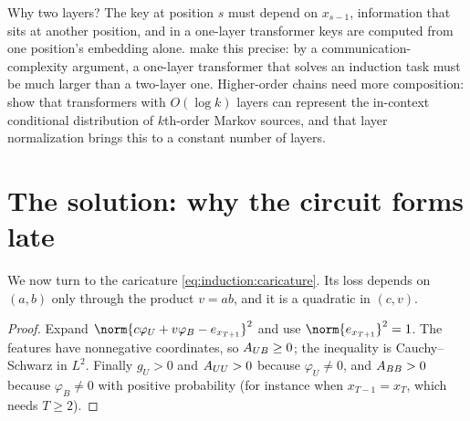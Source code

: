\begin{refsection}
Why two layers? The key at position $s$ must depend on $x_{s-1}$, information that sits at another position, and in a one-layer transformer keys are computed from one position's embedding alone. \Textcite{SanfordEtAl2024} make this precise: by a communication-complexity argument, a one-layer transformer that solves an induction task must be much larger than a two-layer one. Higher-order chains need more composition: \textcite{RajaramanEtAl2024} show that transformers with $O(\log k)$ layers can represent the in-context conditional distribution of $k$th-order Markov sources, and that layer normalization brings this to a constant number of layers.

\section{The solution: why the circuit forms late}\label{sec:induction:dynamics}

We now turn to the caricature \eqref{eq:induction:caricature}. Its loss depends on $(a,b)$ only through the product $v=ab$, and it is a quadratic in $(c,v)$.


\begin{proof}
Expand $\norm{c\varphi_U+v\varphi_B-e_{x_{T+1}}}^2$ and use $\norm{e_{x_{T+1}}}^2=1$. The features have nonnegative coordinates, so $A_{UB}\ge0$; the inequality is Cauchy--Schwarz in $L^2$. Finally $g_U>0$ and $A_{UU}>0$ because $\varphi_U\ne0$, and $A_{BB}>0$ because $\varphi_B\ne0$ with positive probability (for instance when $x_{T-1}=x_T$, which needs $T\ge2$).
\end{proof}


\end{refsection}
